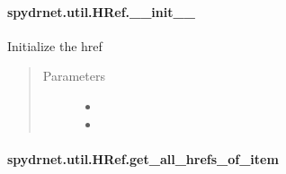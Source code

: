 \documentclass[letterpaper,10pt,english,openany,oneside]{sphinxmanual}
\begin{document}
\paragraph{spydrnet.util.HRef.\_\_init\_\_}
\label{\detokenize{reference/classes/generated/spydrnet.util.HRef.__init__:spydrnet-util-href-init}}\label{\detokenize{reference/classes/generated/spydrnet.util.HRef.__init__::doc}}

\begin{fulllineitems}
\label{\detokenize{reference/classes/generated/spydrnet.util.HRef.__init__:spydrnet.util.HRef.__init__}}
Initialize the href
\begin{quote}\begin{description}
\item[{Parameters}] \leavevmode\begin{itemize}
\item {} 

\item {} 

\end{itemize}

\end{description}\end{quote}

\end{fulllineitems}



\paragraph{spydrnet.util.HRef.get\_all\_hrefs\_of\_item}
\label{\detokenize{reference/classes/generated/spydrnet.util.HRef.get_all_hrefs_of_item:spydrnet-util-href-get-all-hrefs-of-item}}\label{\detokenize{reference/classes/generated/spydrnet.util.HRef.get_all_hrefs_of_item::doc}}
\end{document}
